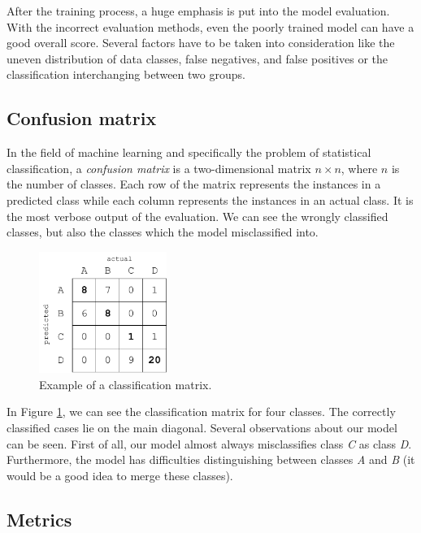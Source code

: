 After the training process, a huge emphasis is put into the model evaluation. With the incorrect evaluation methods, even the poorly trained model can have a good overall score. Several factors have to be taken into consideration like the uneven distribution of data classes, false negatives, and false positives or the classification interchanging between two groups.

\subsection{Confusion matrix}

In the field of machine learning and specifically the problem of statistical classification, a \textit{confusion matrix}\cite{conf_matrix} is a two-dimensional matrix $n \times n$, where $n$ is the number of classes. Each row of the matrix represents the instances in a predicted class while each column represents the instances in an actual class. It is the most verbose output of the evaluation. We can see the wrongly classified classes, but also the classes which the model misclassified into. 

\begin{figure}[h]
\centering
\includegraphics[width=0.37\textwidth]{tex/images/conf_matrix}
\caption{Example of a classification matrix.}
\label{conf_matrix}
\end{figure}

\noindent
In Figure \ref{conf_matrix}, we can see the classification matrix for four classes. The correctly classified cases lie on the main diagonal. Several observations about our model can be seen. First of all, our model almost always misclassifies class \textit{C} as class \textit{D}. Furthermore, the model has difficulties distinguishing between classes \textit{A} and \textit{B} (it would be a good idea to merge these classes).

\subsection{Metrics}

